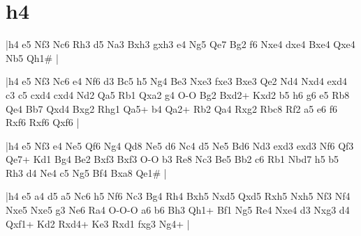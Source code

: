 \section{h4}

\whitename{}
\blackname{}
\makegametitle
|h4 e5 Nf3 Nc6 Rh3 d5 Na3 Bxh3 gxh3 e4 Ng5 Qe7 Bg2 f6 Nxe4 dxe4 Bxe4 Qxe4 Nb5 Qh1\#  |

\whitename{}
\blackname{}
\makegametitle
|h4 e5 Nf3 Nc6 e4 Nf6 d3 Bc5 h5 Ng4 Be3 Nxe3 fxe3 Bxe3 Qe2 Nd4 Nxd4 exd4 c3 c5 cxd4 cxd4 Nd2 Qa5 Rb1 Qxa2 g4 O-O Bg2 Bxd2+ Kxd2 b5 h6 g6 e5 Rb8 Qe4 Bb7 Qxd4 Bxg2 Rhg1 Qa5+ b4 Qa2+ Rb2 Qa4 Rxg2 Rbc8 Rf2 a5 e6 f6 Rxf6 Rxf6 Qxf6  |

\whitename{}
\blackname{}
\makegametitle
|h4 e5 Nf3 e4 Ne5 Qf6 Ng4 Qd8 Ne5 d6 Nc4 d5 Ne5 Bd6 Nd3 exd3 exd3 Nf6 Qf3 Qe7+ Kd1 Bg4 Be2 Bxf3 Bxf3 O-O b3 Re8 Nc3 Be5 Bb2 c6 Rb1 Nbd7 h5 b5 Rh3 d4 Ne4 c5 Ng5 Bf4 Bxa8 Qe1\#  |

\whitename{}
\blackname{}
\makegametitle
|h4 e5 a4 d5 a5 Nc6 h5 Nf6 Nc3 Bg4 Rh4 Bxh5 Nxd5 Qxd5 Rxh5 Nxh5 Nf3 Nf4 Nxe5 Nxe5 g3 Ne6 Ra4 O-O-O a6 b6 Bh3 Qh1+ Bf1 Ng5 Re4 Nxe4 d3 Nxg3 d4 Qxf1+ Kd2 Rxd4+ Ke3 Rxd1 fxg3 Ng4+  |

